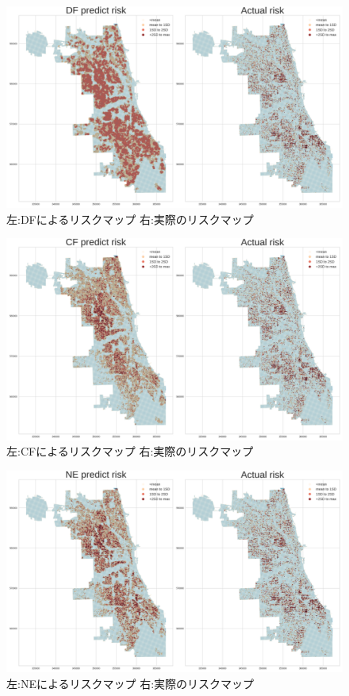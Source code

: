 \begin{figure}
  \centering %
  \includegraphics[scale=0.25]{./non-crime-timeseries-fig/DF_riskmap.png}
  \caption{左:DFによるリスクマップ 右:実際のリスクマップ}
  \label{fig:non-crime-timeseries-df-risk}
\end{figure}

\begin{figure}
  \centering %
  \includegraphics[scale=0.25]{./non-crime-timeseries-fig/CF_riskmap.png}
  \caption{左:CFによるリスクマップ 右:実際のリスクマップ}
  \label{fig:non-crime-timeseries-cf-risk}
\end{figure}

\begin{figure}
  \centering %
  \includegraphics[scale=0.25]{./non-crime-timeseries-fig/NE_riskmap.png}
  \caption{左:NEによるリスクマップ 右:実際のリスクマップ}
  \label{fig:non-crime-timeseries-ne-risk}
\end{figure}

